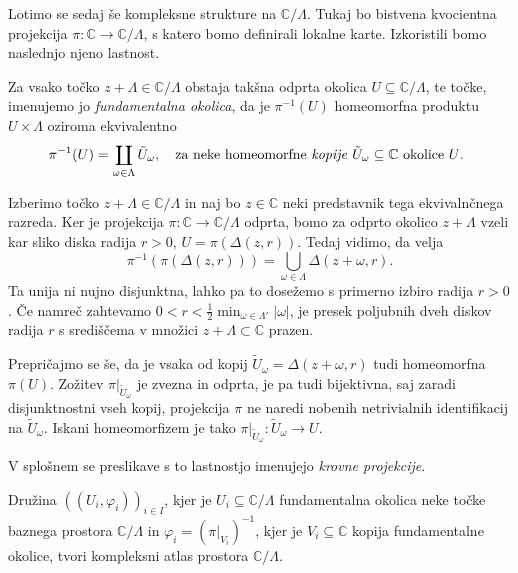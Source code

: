 \documentclass[mat1]{fmfdelo}
\numberwithin{equation}{section}
\newcommand{\C}{\mathbb C}
\newcommand{\om}{\omega}
\newcommand{\inv}{^{-1}}
\newcommand{\torus}{\C/\Lambda}
\newcommand{\abs}[1]{\left\lvert #1 \right\rvert}
\newcommand{\disk}[2]{\Delta(#1, #2)}
\theoremstyle{definition}
\begin{document}
Lotimo se sedaj še kompleksne strukture na $\torus$. Tukaj bo bistvena kvocientna projekcija $\pi: \C \to \torus$, s katero bomo definirali lokalne karte. Izkoristili bomo naslednjo njeno lastnost. 

\begin{lema}
   Za vsako točko $z + \Lambda \in \torus$ obstaja takšna odprta okolica $U \subseteq \torus$, te točke, imenujemo jo \emph{fundamentalna okolica}, da je $\pi\inv(U)$ homeomorfna produktu $U \times \Lambda$ oziroma ekvivalentno 
   \[
        \pi\inv(U) = \coprod_{\om \in \Lambda} \tilde{U}_\om, \quad \text{za neke homeomorfne \emph{kopije} $\tilde{U}_\om \subseteq \C$ okolice $U$. } 
   \]
\end{lema}

\begin{dokaz}
    Izberimo točko $z + \Lambda \in \torus$ in naj bo $z \in \C$ neki predstavnik tega ekvivalnčnega razreda. Ker je projekcija $\pi: \C \to \torus$ odprta, bomo za odprto okolico $z + \Lambda$ vzeli kar sliko diska radija $r>0$, $U = \pi(\disk{z}{r})$. Tedaj vidimo, da velja 
    \[
        \pi\inv(\pi(\disk{z}{r})) = \bigcup_{\om \in \Lambda} \disk{z + \om}{r}.
    \] 
    Ta unija ni nujno disjunktna, lahko pa to dosežemo s primerno izbiro radija $r>0$. Če namreč zahtevamo $0 < r < \frac12 \min_{\om \in \Lambda'} \abs{\om}$, je presek poljubnih dveh diskov radija $r$ s središčema v množici $z + \Lambda \subset \C$ prazen. 

    Prepričajmo se še, da je vsaka od kopij $\tilde{U}_\om = \disk{z + \om}{r}$ tudi homeomorfna $\pi(U)$. Zožitev $\pi|_{\tilde{U}_\om}$ je zvezna in odprta, je pa tudi bijektivna, saj zaradi disjunktnostni vseh kopij, projekcija $\pi$ ne naredi nobenih netrivialnih identifikacij na $\tilde{U}_\om$. Iskani homeomorfizem je tako $\pi|_{\tilde{U}_\om} : \tilde{U}_\om \to U$.
\end{dokaz}

\begin{opomba}
    V splošnem se preslikave s to lastnostjo imenujejo \emph{krovne projekcije}.
\end{opomba}

\begin{trditev}
    Družina $((U_i, \varphi_i))_{i \in I}$, kjer je $U_i \subseteq \torus$ fundamentalna okolica neke točke baznega prostora $\torus$ in $\varphi_i = (\pi|_{V_i})\inv$, kjer je $V_i \subseteq \C$ kopija fundamentalne okolice, tvori kompleksni atlas prostora $\torus$.  
\end{trditev}
\end{document}
